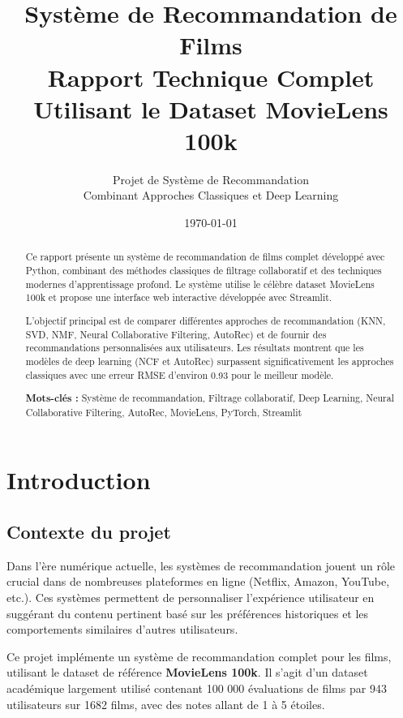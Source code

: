 \documentclass[12pt,a4paper]{article}
\title{
    \vspace{2cm}
    \Huge \textbf{Système de Recommandation de Films} \\
    \vspace{0.5cm}
    \Large Rapport Technique Complet \\
    \vspace{0.3cm}
    \large Utilisant le Dataset MovieLens 100k
    \vspace{2cm}
}
\author{
    Projet de Système de Recommandation \\
    Combinant Approches Classiques et Deep Learning
}
\date{\today}
\begin{document}
\maketitle
\thispagestyle{empty}

\newpage
\tableofcontents
\newpage

\begin{abstract}
Ce rapport présente un système de recommandation de films complet développé avec Python, combinant des méthodes classiques de filtrage collaboratif et des techniques modernes d'apprentissage profond. Le système utilise le célèbre dataset MovieLens 100k et propose une interface web interactive développée avec Streamlit. 

L'objectif principal est de comparer différentes approches de recommandation (KNN, SVD, NMF, Neural Collaborative Filtering, AutoRec) et de fournir des recommandations personnalisées aux utilisateurs. Les résultats montrent que les modèles de deep learning (NCF et AutoRec) surpassent significativement les approches classiques avec une erreur RMSE d'environ 0.93 pour le meilleur modèle.

\textbf{Mots-clés :} Système de recommandation, Filtrage collaboratif, Deep Learning, Neural Collaborative Filtering, AutoRec, MovieLens, PyTorch, Streamlit
\end{abstract}

\section{Introduction}

\subsection{Contexte du projet}

Dans l'ère numérique actuelle, les systèmes de recommandation jouent un rôle crucial dans de nombreuses plateformes en ligne (Netflix, Amazon, YouTube, etc.). Ces systèmes permettent de personnaliser l'expérience utilisateur en suggérant du contenu pertinent basé sur les préférences historiques et les comportements similaires d'autres utilisateurs.

Ce projet implémente un système de recommandation complet pour les films, utilisant le dataset de référence \textbf{MovieLens 100k}. Il s'agit d'un dataset académique largement utilisé contenant 100 000 évaluations de films par 943 utilisateurs sur 1682 films, avec des notes allant de 1 à 5 étoiles.
\end{document}
